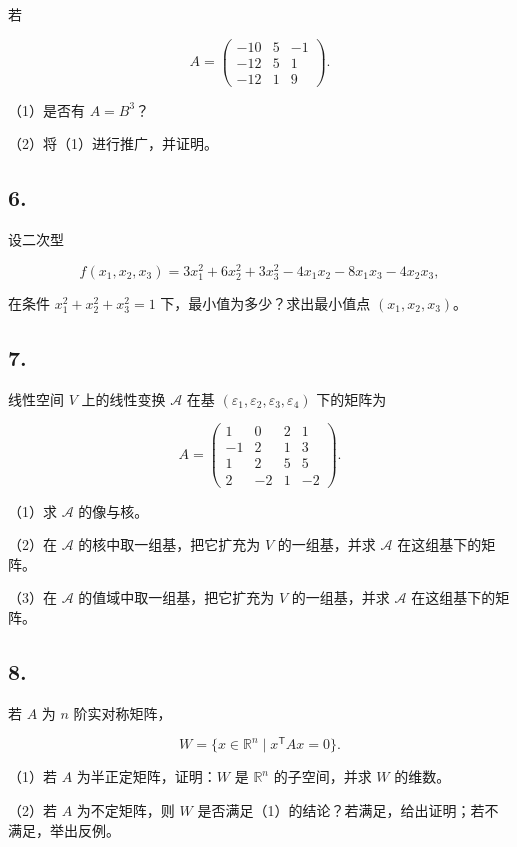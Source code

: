 \documentclass[11pt,fontset=fandol]{ctexart}
\begin{document}
若

\[
A=\begin{pmatrix}
-10&5&-1\\
-12&5&1\\
-12&1&9
\end{pmatrix}.
\]

（1）是否有 \(A=B^3\)？

（2）将（1）进行推广，并证明。

\subsection{6.}\label{section-4}

设二次型

\[
f(x_1,x_2,x_3)=3x_1^2+6x_2^2+3x_3^2-4x_1x_2-8x_1x_3-4x_2x_3,
\]

在条件 \(x_1^2+x_2^2+x_3^2=1\) 下，最小值为多少？求出最小值点
\((x_1,x_2,x_3)\)。

\subsection{7.}\label{section-5}

线性空间 \(V\) 上的线性变换 \(\mathcal A\) 在基
\((\varepsilon_1,\varepsilon_2,\varepsilon_3,\varepsilon_4)\) 下的矩阵为

\[
A=\begin{pmatrix}
1&0&2&1\\
-1&2&1&3\\
1&2&5&5\\
2&-2&1&-2
\end{pmatrix}.
\]

（1）求 \(\mathcal A\) 的像与核。

（2）在 \(\mathcal A\) 的核中取一组基，把它扩充为 \(V\) 的一组基，并求
\(\mathcal A\) 在这组基下的矩阵。

（3）在 \(\mathcal A\) 的值域中取一组基，把它扩充为 \(V\) 的一组基，并求
\(\mathcal A\) 在这组基下的矩阵。

\subsection{8.}\label{section-6}

若 \(A\) 为 \(n\) 阶实对称矩阵，

\[
W=\{x\in\mathbb R^n\mid x^{\mathsf T}Ax=0\}.
\]

（1）若 \(A\) 为半正定矩阵，证明：\(W\) 是 \(\mathbb R^n\)
的子空间，并求 \(W\) 的维数。

（2）若 \(A\) 为不定矩阵，则 \(W\)
是否满足（1）的结论？若满足，给出证明；若不满足，举出反例。
\end{document}
